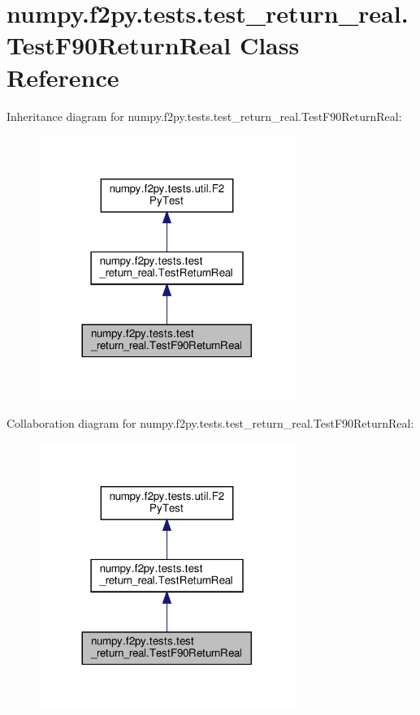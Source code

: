 \hypertarget{classnumpy_1_1f2py_1_1tests_1_1test__return__real_1_1TestF90ReturnReal}{}\section{numpy.\+f2py.\+tests.\+test\+\_\+return\+\_\+real.\+Test\+F90\+Return\+Real Class Reference}
\label{classnumpy_1_1f2py_1_1tests_1_1test__return__real_1_1TestF90ReturnReal}


Inheritance diagram for numpy.\+f2py.\+tests.\+test\+\_\+return\+\_\+real.\+Test\+F90\+Return\+Real\+:
\nopagebreak
\begin{figure}[H]
\begin{center}
\leavevmode
\includegraphics[width=236pt]{classnumpy_1_1f2py_1_1tests_1_1test__return__real_1_1TestF90ReturnReal__inherit__graph}
\end{center}
\end{figure}


Collaboration diagram for numpy.\+f2py.\+tests.\+test\+\_\+return\+\_\+real.\+Test\+F90\+Return\+Real\+:
\nopagebreak
\begin{figure}[H]
\begin{center}
\leavevmode
\includegraphics[width=236pt]{classnumpy_1_1f2py_1_1tests_1_1test__return__real_1_1TestF90ReturnReal__coll__graph}
\end{center}
\end{figure}
